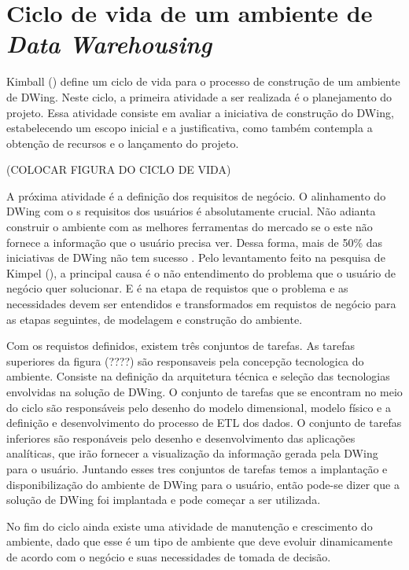 %

\section{Ciclo de vida de um ambiente de \emph{Data Warehousing}}

%

Kimball (\citeyear{kimball2002}) define um ciclo de vida para o processo de construção de um ambiente de DWing. Neste ciclo, a primeira atividade a ser realizada é o planejamento do projeto. Essa atividade consiste em avaliar a iniciativa de construção do DWing, estabelecendo um escopo inicial e a justificativa, como também contempla a obtenção  de recursos e o lançamento do projeto.

(COLOCAR FIGURA DO CICLO DE VIDA)
%
%

A próxima atividade é a definição dos requisitos de negócio. O alinhamento do DWing com o s requisitos dos usuários é absolutamente crucial. Não adianta construir o ambiente com as melhores ferramentas do mercado se o este não fornece a informação que o usuário precisa ver. Dessa forma, mais de 50\% das iniciativas de DWing não tem sucesso \cite{sen2011}. Pelo levantamento feito na pesquisa de Kimpel (\citeyear{kimpel2013}), a principal causa é o não entendimento do problema que o usuário de negócio quer solucionar. E é na etapa de requistos que o problema e as necessidades devem ser entendidos e transformados em requistos de negócio para as etapas seguintes, de modelagem e construção do ambiente.

%

Com os requistos definidos, existem três conjuntos de tarefas. As tarefas superiores da figura (????) são responsaveis pela concepção tecnologica do ambiente. Consiste na definição da arquitetura técnica e  seleção das tecnologias envolvidas na solução de DWing. O conjunto de tarefas que se encontram no meio do ciclo são responsáveis pelo desenho do modelo dimensional, modelo físico e a definição e desenvolvimento do processo de ETL dos dados. O conjunto de tarefas inferiores são responáveis pelo desenho e desenvolvimento das aplicações analíticas, que irão fornecer a visualização da informação gerada pela DWing para o usuário. Juntando esses tres conjuntos de tarefas temos a implantação e disponibilização do ambiente de DWing para o usuário, então pode-se dizer que a solução de DWing foi implantada e pode começar a ser utilizada. 

%

No fim do ciclo ainda existe uma atividade de manutenção e crescimento do ambiente, dado que esse é um tipo de ambiente que deve evoluir dinamicamente de acordo com o negócio e suas necessidades de tomada de decisão.
